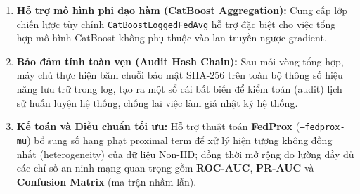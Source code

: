 \begin{enumerate}
    \item \textbf{Hỗ trợ mô hình phi đạo hàm (CatBoost Aggregation):}
    Cung cấp lớp chiến lược tùy chỉnh \texttt{CatBoostLoggedFedAvg} hỗ trợ đặc biệt cho việc tổng hợp mô hình CatBoost không phụ thuộc vào lan truyền ngược gradient.

    \item \textbf{Bảo đảm tính toàn vẹn (Audit Hash Chain):}
    Sau mỗi vòng tổng hợp, máy chủ thực hiện băm chuỗi bảo mật SHA-256 trên toàn bộ thông số hiệu năng lưu trữ trong log, tạo ra một sổ cái bất biến để kiểm toán (audit) lịch sử huấn luyện hệ thống, chống lại việc làm giả nhật ký hệ thống.

    \item \textbf{Kế toán và Điều chuẩn tối ưu:}
    Hỗ trợ thuật toán \textbf{FedProx} \cite{li2020federated} (\texttt{--fedprox-mu}) bổ sung số hạng phạt proximal term để xử lý hiện tượng không đồng nhất (heterogeneity) của dữ liệu Non-IID; đồng thời mở rộng đo lường đầy đủ các chỉ số an ninh mạng quan trọng gồm \textbf{ROC-AUC}, \textbf{PR-AUC} và \textbf{Confusion Matrix} (ma trận nhầm lẫn).
\end{enumerate}